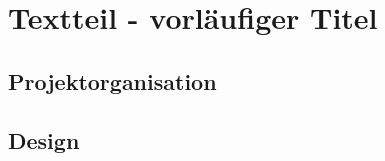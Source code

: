 \section{Textteil - vorläufiger Titel} \label{Textteil}





\subsection{Projektorganisation}

\subsection{Design}


